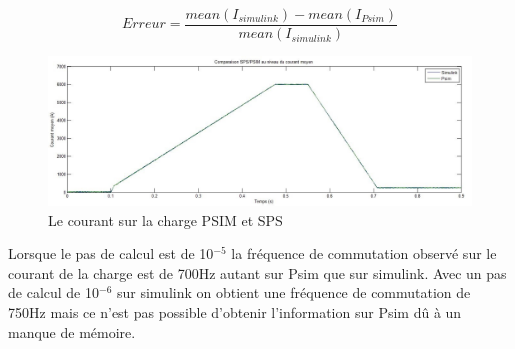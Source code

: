 \documentclass[11pt,letterpaper,final]{report}
\begin{document}
\begin{equation}
Erreur = \frac{mean(I_{simulink})-mean(I_{Psim})}{mean(I_{simulink})}
\label{eq2}
\end{equation}


\begin{figure}[ht]
\centering
\includegraphics[scale=0.5]{comp_PSIM_SPS.jpg}
\caption{Le courant sur la charge PSIM et SPS}
\label{comp_PSIM_SPS}
\end{figure}

Lorsque le pas de calcul est de 10$^{-5}$ la fréquence de commutation observé sur le courant de la charge est de 700Hz autant sur Psim que sur simulink. Avec un pas de calcul de 10$^{-6}$ sur simulink on obtient une fréquence de commutation de 750Hz mais ce n'est pas possible d'obtenir l'information sur Psim dû à un manque de mémoire.  
\end{document}
